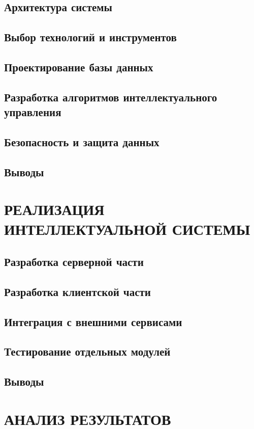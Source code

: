 \documentclass[12pt]{article}
\begin{document}
\begin{titlepage}
\subsection{Архитектура системы}
\subsection{Выбор технологий и инструментов}
\subsection{Проектирование базы данных}
\subsection{Разработка алгоритмов интеллектуального управления}
\subsection{Безопасность и защита данных}
\subsection{Выводы}

\newpage
\section{РЕАЛИЗАЦИЯ ИНТЕЛЛЕКТУАЛЬНОЙ СИСТЕМЫ}
\subsection{Разработка серверной части}
\subsection{Разработка клиентской части}
\subsection{Интеграция с внешними сервисами}
\subsection{Тестирование отдельных модулей}
\subsection{Выводы}

\newpage
\section{АНАЛИЗ РЕЗУЛЬТАТОВ}

\end{titlepage}
\end{document}
